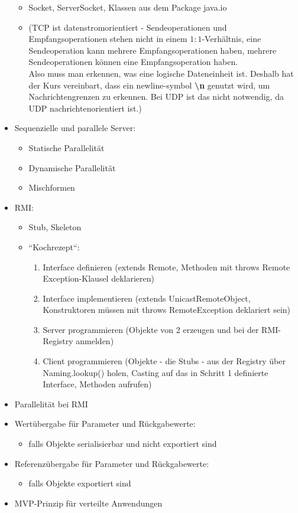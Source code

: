 \begin{itemize}
    \begin{itemize}
        \item Socket, ServerSocket, Klassen aus dem Package java.io
        \item[] (TCP ist datenstromorientiert - Sendeoperationen und Empfangsoperationen stehen nicht in einem $1:1$-Verhältnis, eine Sendeoperation kann mehrere Empfangsoperationen haben, mehrere Sendeoperationen können eine Empfangsoperation haben.\\
        Also muss man erkennen, was eine logische Dateneinheit ist.
        Deshalb hat der Kurs vereinbart, dass ein newline-symbol \textbf{\textbackslash{n}} genutzt wird, um Nachrichtengrenzen zu erkennen.
        Bei UDP ist das nicht notwendig, da UDP nachrichtenorientiert ist.)
    \end{itemize}
    \item Sequenzielle und parallele Server:
    \begin{itemize}
        \item Statische Parallelität
        \item Dynamische Parallelität
        \item Mischformen
    \end{itemize}
    \item RMI:
    \begin{itemize}
        \item Stub, Skeleton
        \item ``Kochrezept``:
        \begin{enumerate}
            \item Interface definieren (extends Remote, Methoden mit throws Remote Exception-Klausel deklarieren)
            \item Interface implementieren (extends UnicastRemoteObject, Konstruktoren müssen mit throws RemoteException deklariert sein)
            \item Server programmieren (Objekte von 2 erzeugen und bei der RMI-Registry anmelden)
            \item Client programmieren (Objekte - die Stubs - aus der Registry über Naming.lookup() holen, Casting auf das in Schritt 1 definierte Interface, Methoden aufrufen)
        \end{enumerate}
    \end{itemize}
    \item Parallelität bei RMI
    \item Wertübergabe für Parameter und Rückgabewerte:
    \begin{itemize}
        \item falls Objekte serialisierbar und nicht exportiert sind
    \end{itemize}
    \item Referenzübergabe für Parameter und Rückgabewerte:
    \begin{itemize}
        \item falls Objekte exportiert sind
    \end{itemize}
    \item MVP-Prinzip für verteilte Anwendungen
\end{itemize}

